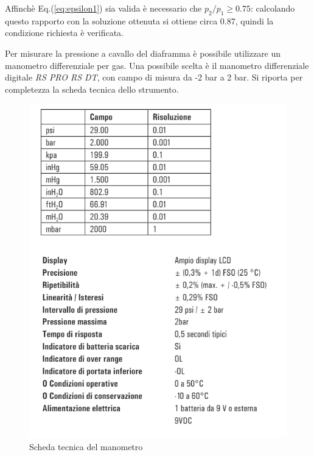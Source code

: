 Affinchè Eq.(\ref{eq:epsilon1}) sia valida è necessario che $p_2/p_1 \geqslant 0.75 $: calcolando questo rapporto con la soluzione ottenuta si ottiene circa 0.87, quindi la condizione richiesta è verificata.

Per misurare la pressione a cavallo del diaframma è possibile utilizzare un manometro differenziale per gas. Una possibile scelta è il manometro differenziale digitale \textit{RS PRO RS DT}, con campo di misura da -2 bar a 2 bar. Si riporta per completezza la scheda tecnica dello strumento.
\begin{figure} [H]
	\centering
	\includegraphics[width=0.5\linewidth]{chapters/3-misuradiaframma/scheda}
	\caption{Scheda tecnica del manometro}
	\label{fig:scheda}
\end{figure}
